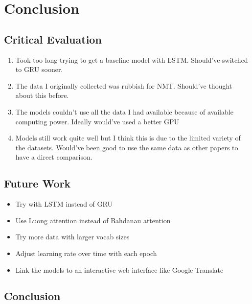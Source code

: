 
\chapter{Conclusion}
\newpage
\section{Critical Evaluation}

\begin{enumerate}
    \item Took too long trying to get a baseline model with LSTM. Should've switched to GRU sooner.
    \item The data I originally collected was rubbish for NMT. Should've thought about this before.
    \item The models couldn't use all the data I had available because of available computing power. Ideally would've used a better GPU
    \item Models still work quite well but I think this is due to the limited variety of the datasets. Would've been good to use the same data as other papers to have a direct comparison.
\end{enumerate}


\section{Future Work}

\begin{itemize}
    \item Try with LSTM instead of GRU
    \item Use Luong \cite{luong_effective_2015} attention instead of Bahdanau \cite{bahdanau_neural_2016} attention
    \item Try more data with larger vocab sizes
    \item Adjust learning rate over time with each epoch
    \item Link the models to an interactive web interface like Google Translate
\end{itemize}


\section{Conclusion}